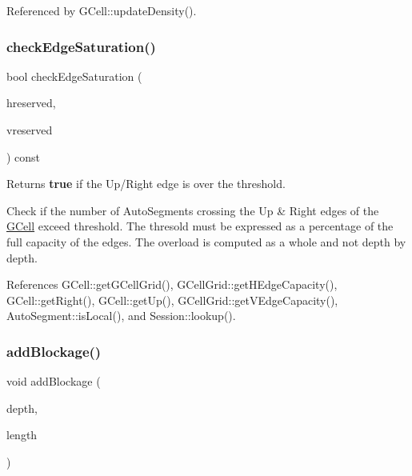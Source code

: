 Referenced by G\+Cell\+::update\+Density().

\mbox{\label{classKatabatic_1_1GCell_af4dcc99733b7ea77e8c3c7da9ac3cd3c}} 
\subsubsection{\texorpdfstring{check\+Edge\+Saturation()}{checkEdgeSaturation()}}
{\footnotesize\ttfamily bool check\+Edge\+Saturation (\begin{DoxyParamCaption}\item[{size\+\_\+t}]{hreserved,  }\item[{size\+\_\+t}]{vreserved }\end{DoxyParamCaption}) const}

\begin{DoxyReturn}{Returns}
{\bfseries true} if the Up/\+Right edge is over the {\ttfamily threshold}.
\end{DoxyReturn}
Check if the number of Auto\+Segments crossing the Up \& Right edges of the \mbox{\hyperlink{classKatabatic_1_1GCell}{G\+Cell}} exceed {\ttfamily threshold}. The {\ttfamily thresold} must be expressed as a percentage of the full capacity of the edges. The overload is computed as a whole and not depth by depth. 

References G\+Cell\+::get\+G\+Cell\+Grid(), G\+Cell\+Grid\+::get\+H\+Edge\+Capacity(), G\+Cell\+::get\+Right(), G\+Cell\+::get\+Up(), G\+Cell\+Grid\+::get\+V\+Edge\+Capacity(), Auto\+Segment\+::is\+Local(), and Session\+::lookup().

\mbox{\label{classKatabatic_1_1GCell_a1270eab34ac57f21c0286a5455044a0d}} 
\subsubsection{\texorpdfstring{add\+Blockage()}{addBlockage()}}
{\footnotesize\ttfamily void add\+Blockage (\begin{DoxyParamCaption}\item[{unsigned int}]{depth,  }\item[{\textbf{ Db\+U\+::\+Unit}}]{length }\end{DoxyParamCaption})}

